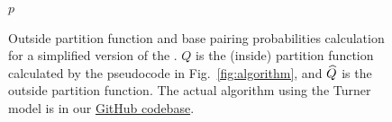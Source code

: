 \begin{figure}[h]
\begin{minipage}{.85\textwidth}
\begin{algorithmic}[1]
    \EndFor
    \State \Return $p$ 
\EndFunction
\end{algorithmic}
\end{minipage}
\caption{
  Outside partition function and base pairing probabilities calculation for a simplified version of the \linearpartition.
  $Q$ is the (inside) partition function calculated by the pseudocode in Fig.~\ref{fig:algorithm}, and $\widehat{Q}$ is the outside partition function. 
The actual algorithm using the Turner model is in our \href{https://github.com/LinearFold/LinearPartition}{GitHub codebase}.
\label{fig:outside}}
\vspace{-0.3cm}
\end{figure}


